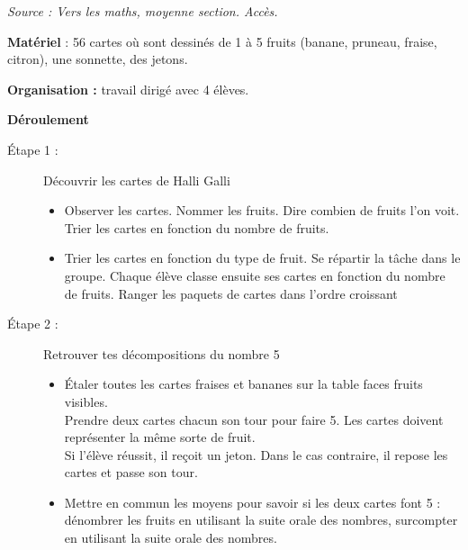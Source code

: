 \begin{exercice*}
   \smallskip
   
   {\it Source : Vers les maths, moyenne section. Accès.} \smallskip
   
   {\bf Matériel} : 56 cartes où sont dessinés de 1 à 5 fruits (banane, pruneau, fraise, citron), une sonnette, des jetons. \smallskip

   {\bf Organisation :} travail dirigé avec 4 élèves. \smallskip

   {\bf Déroulement}
   \begin{description}
      \item[Étape 1 :] Découvrir les cartes de Halli Galli
         \begin{itemize}
            \item Observer les cartes. Nommer les fruits. Dire combien de fruits l’on voit. \\
               Trier les cartes en fonction du nombre de fruits.
            \item Trier les cartes en fonction du type de fruit. Se répartir la tâche dans le groupe. Chaque élève classe ensuite ses cartes en fonction du nombre de fruits. Ranger les paquets de cartes dans l’ordre croissant
         \end{itemize}
   
      \item[Étape 2 :] Retrouver tes décompositions du nombre 5
         \begin{itemize}
            \item Étaler toutes les cartes fraises et bananes sur la table faces fruits visibles. \\
               Prendre deux cartes chacun son tour pour faire 5. Les cartes doivent représenter la même sorte de fruit. \\
               Si l’élève réussit, il reçoit un jeton. Dans le cas contraire, il repose les cartes et passe son tour.
            \item Mettre en commun les moyens pour savoir si les deux cartes font 5 : dénombrer les fruits en utilisant la suite orale des nombres, surcompter en utilisant la suite orale des nombres.
         \end{itemize}


\end{description}
\end{exercice*}
